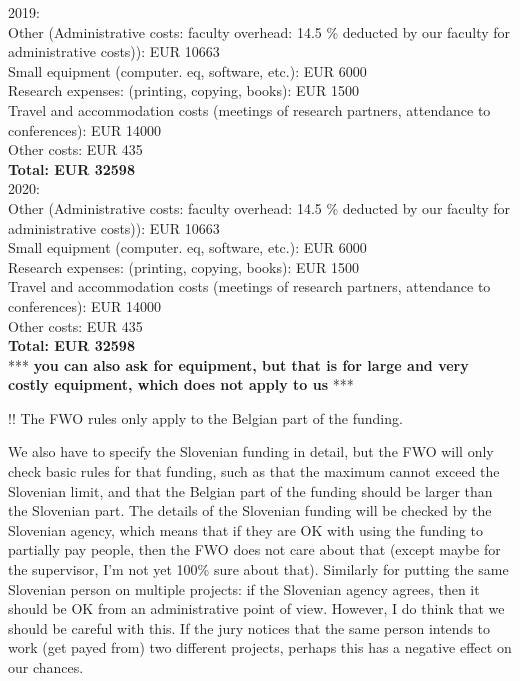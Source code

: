 \documentclass[11pt,dvipsnames,usenames,a4paper]{article}
\begin{document}
2019: \\
Other (Administrative costs: faculty overhead: 14.5 \% deducted by our faculty for administrative costs)): EUR 10663 \\
Small equipment (computer. eq, software, etc.): EUR 6000 \\
Research expenses: (printing, copying, books): EUR 1500 \\
Travel and accommodation costs (meetings of research partners, attendance to conferences): EUR 14000  \\
Other costs: EUR 435 \\
\textbf{Total: EUR 32598} \\

2020: \\
Other (Administrative costs: faculty overhead: 14.5 \% deducted by our faculty for administrative costs)): EUR 10663 \\
Small equipment (computer. eq, software, etc.): EUR 6000 \\
Research expenses: (printing, copying, books): EUR 1500 \\
Travel and accommodation costs (meetings of research partners, attendance to conferences): EUR 14000  \\
Other costs: EUR 435 \\
\textbf{Total: EUR 32598} \\


*** {\bf\color{blue} you can also ask for equipment, but that is for large and very costly equipment, which does not apply to us} ***

!! The FWO rules only apply to the Belgian part of the funding.

We also have to specify the Slovenian funding in detail, but the FWO will only check basic rules for that funding, such as that the maximum cannot exceed the Slovenian limit, and that the Belgian part of the funding should be larger than the Slovenian part. The details of the Slovenian funding will be checked by the Slovenian agency, which means that if they are OK with using the funding to partially pay people, then the FWO does not care about that (except maybe for the supervisor, I'm not yet 100\% sure about that). Similarly for putting the same Slovenian person on multiple projects: if the Slovenian agency agrees, then it should be OK from an administrative point of view. However, I do think that we should be careful with this. If the jury notices that the same person intends to work (get payed from) two different projects, perhaps this has a negative effect on our chances.
\end{document}
